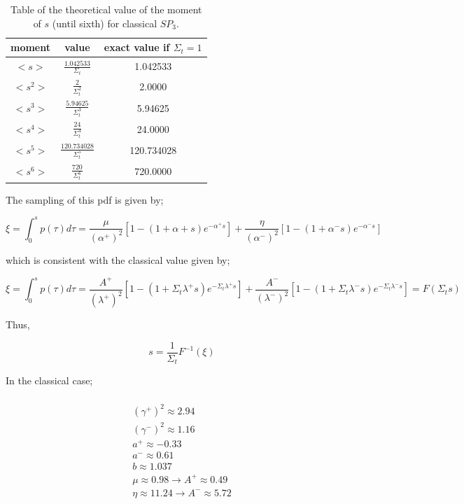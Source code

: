 \documentclass[a4paper, 12pt]{report}
\newcommand{\bl}{\big<}
\newcommand{\bg}{\big>}
\begin{document}
\begin{center}
\begin{table}
\begin{center}
\begin{tabular}{|c|c|c|}
\hline
moment & value & exact value if $\Sigma_t = 1$ \\ \hline
$\bl s \bg$ &$ \frac{1.042533}{\Sigma_t}$ & 1.042533  \\ \hline
$\bl s^2 \bg$ & $\frac{2}{\Sigma_t^2}$ & 2.0000 \\ \hline
$\bl s^3 \bg$ &$ \frac{5.94625}{\Sigma_t^3}$ & 5.94625\\ \hline
$\bl s^4 \bg$ &$ \frac{24}{ \Sigma_t^4}$ & 24.0000\\ \hline
$\bl s^5 \bg$ &$ \frac{120.734028}{\Sigma_t^5}$ & 120.734028 \\ \hline
$\bl s^6 \bg$ &$ \frac{720}{ \Sigma_t^6}$ & 720.0000 \\ \hline
\end{tabular}
\caption{\label{momentsp3} Table of the theoretical value of the moment of $s$ (until sixth) for classical $SP_3$. }
\end{center}
\end{table}
\end{center}

The sampling of this pdf is given by;

\begin{equation}
\xi = \int_0^s p(\tau) d\tau = \frac{\mu}{(\alpha^+)^2}\left[1 - (1+\alpha+s)e^{-\alpha^+s} \right] + \frac{\eta}{(\alpha^-)^2}\left[1 - (1+\alpha^-s)e^{-\alpha^-s} \right]
\end{equation}

which is consistent with the classical value given by;

\begin{equation}
\xi = \int_0^s p(\tau) d\tau = \frac{A^+}{(\lambda^+)^2}\left[1 - (1+\Sigma_t\lambda^+s)e^{-\Sigma_t\lambda^+s} \right] + \frac{A^-}{(\lambda^-)^2}\left[1 - (1+\Sigma_t\lambda^-s)e^{-\Sigma_t\lambda^-s} \right] = F(\Sigma_t s) 
\end{equation}

Thus,

\begin{equation}
 s = \frac{1}{\Sigma_t} F^{-1}(\xi)
\end{equation}

In the classical case;

\begin{multline}
\\
(\gamma^+)^2 \approx 2.94 \\
(\gamma^-)^2 \approx 1.16 \\
a^+ \approx -0.33 \\
a^- \approx 0.61 \\
b \approx 1.037 \\
\mu \approx 0.98  \rightarrow A^+ \approx 0.49\\
\eta \approx 11.24 \rightarrow A^- \approx 5.72\\
\end{multline} 
\end{document}
